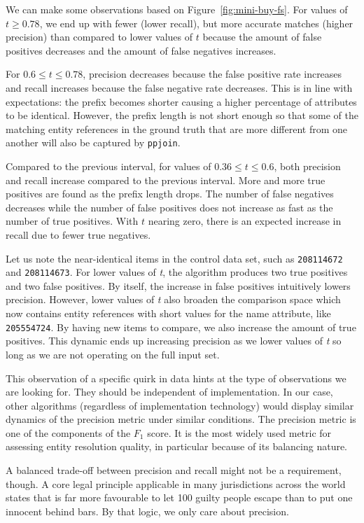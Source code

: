 We can make some observations based on Figure~\ref{fig:mini-buy-fs}.
For values of $t \geq 0.78$, we end up with fewer (lower recall), but more
accurate matches (higher precision) than compared to lower values of $t$ because
the amount of false positives decreases and the amount of false negatives
increases.

For $0.6 \leq t \le 0.78$, precision decreases because the false
positive rate increases and recall increases because the false negative rate
decreases.
This is in line with expectations: the prefix becomes shorter causing a higher
percentage of attributes to be identical.
However, the prefix length is not short enough so that some of the matching
entity references in the ground truth that are more different from one another
will also be captured by \texttt{ppjoin}.

Compared to the previous interval, for values of $0.36 \leq t \le 0.6$, both
precision and recall increase compared to the previous interval.
More and more true positives are found as the prefix length drops.
The number of false negatives decreases while the number of false positives
does not increase as fast as the number of true positives.
With $t$ nearing zero, there is an expected increase in recall due to fewer
true negatives.

Let us note the near-identical items in the control data set, such as
\texttt{208114672} and \texttt{208114673}.
For lower values of \textit{t}, the algorithm produces two true positives and
two false positives.
By itself, the increase in false positives intuitively lowers precision.
However, lower values of \textit{t} also broaden the comparison space which
now contains entity references with short values for the name attribute,
like \texttt{205554724}.
By having new items to compare, we also increase the amount of true positives.
This dynamic ends up increasing precision as we lower values of \textit{t} so
long as we are not operating on the full input set.

This observation of a specific quirk in data hints at the type of observations
we are looking for.
They should be independent of implementation.
In our case, other algorithms (regardless of implementation technology) would
display similar dynamics of the precision metric under similar conditions.
The precision metric is one of the components of the $F_1$ score.
It is the most widely used metric for assessing entity resolution quality,
in particular because of its balancing nature.

A balanced trade-off between precision and recall might not be a requirement,
though.
A core legal principle applicable in many jurisdictions across the world states
that is far more favourable to let 100 guilty people escape than to
put one innocent behind bars.
By that logic, we only care about precision.

